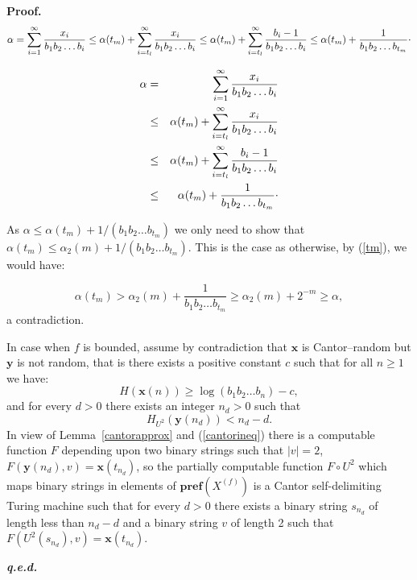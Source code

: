 \documentclass[11pt,a4paper,twoside]{article}
\def \pref#1{{\mathbf{pref}({#1})}}
\newcommand{\x}{{\mathbf x}}
\newcommand{\y}{{\mathbf y}}
\def \XF  {X^{(f)}}
\def \raisedot {\raisebox{.5ex}{.}}
\newenvironment{proof}{\textbf{Proof.\,}}{\hfill\textbf{\itshape
q.e.d.}\par}
\begin{document}
\begin{proof}
\[\alpha  =   \sum_{i=1}^{\infty} \frac{x_{i}}{b_{1}b_{2}\ldots b_{i}}
 \le   \alpha (t_{m}) + \sum_{i=t_{l}}^{\infty}
\frac{x_{i}}{b_{1}b_{2}\ldots b_{i}}
 \le  \alpha (t_{m}) + \sum_{i=t_{l}}^{\infty}
\frac{b_{i}-1}{b_{1}b_{2}\ldots b_{i}} \\
 \le  \alpha (t_{m}) + \frac{1}{b_{1}b_{2}\ldots b_{t_{m}}} \raisedot
\]

\begin{eqnarray*}
\alpha & = &  \sum_{i=1}^{\infty} \frac{x_{i}}{b_{1}b_{2}\ldots b_{i}} \\
& \le &  \alpha (t_{m}) + \sum_{i=t_{l}}^{\infty}
\frac{x_{i}}{b_{1}b_{2}\ldots b_{i}} \\
& \le & \alpha (t_{m}) + \sum_{i=t_{l}}^{\infty}
\frac{b_{i}-1}{b_{1}b_{2}\ldots b_{i}} \\
& \le & \alpha (t_{m}) + \frac{1}{b_{1}b_{2}\ldots b_{t_{m}}} \raisedot
\end{eqnarray*}
\fi

As $\alpha \le \alpha (t_{m}) + 1/(b_{1}b_{2}\ldots b_{t_{m}})$ we only need
to show that $\alpha (t_{m}) \le \alpha_{2} (m)+ 1/(b_{1}b_{2}\ldots
b_{t_{m}})$. This is the case as otherwise, by  (\ref{tm}), we would have:

\[\alpha (t_{m}) > \alpha_{2} (m) +
 \frac{1}{b_{1}b_{2}\ldots b_{t_{m}}} \ge \alpha_{2} (m) + 2^{-m}
 \ge \alpha,\]
 a contradiction.
 
 
In case when $f$ is bounded, assume by contradiction that $\x$ is
Cantor--random but $\y$ is not random, that is there exists a positive
constant $c$ such that for all $n\ge 1$ we have:
\begin{equation}
\label{crand}
H(\x(n)) \ge \log (b_{1}b_{2}\ldots b_{n}) -c,
\end{equation}
and for every $d>0$ there exists an integer $n_{d}>0$ such that
\begin{equation}
\label{not-brand}
H_{U^{2}} (\y(n_{d})) < n_{d} - d.
\end{equation}
In view of Lemma~\ref{cantorapprox} and (\ref{cantorineq}) there is a
computable function $F$ depending upon two binary strings such that $|v|=2$,
$F(\y (n_{d}), v) =
\x (t_{n_{d}})$, so the partially computable function $F \circ U^{2}$
which 
maps binary strings in elements of $\pref{\XF}$ is a
Cantor self-delimiting
Turing machine such that for every $d>0$ there exists a binary string
$s_{n_{d}}$ of length less than
$n_{d} - d$ and a binary string $v$ of length  2 such that
$F(U^{2}(s_{n_{d}}), v) = \x(t_{n_{d}})$.


\end{proof}
\end{document}
